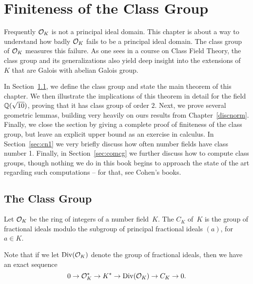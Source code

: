 \chapter{Finiteness of the Class Group}\label{ch:classgroup}
Frequently $\mathcal{O}_K$ is not a principal ideal domain.  This chapter is
about a way to understand how badly $\mathcal{O}_K$ fails to be a principal
ideal domain.  The class group of $\mathcal{O}_K$ measures this failure.  As
one sees in a course on Class Field Theory, the class group and its
generalizations also yield deep insight into the
extensions of~$K$ that are Galois with abelian Galois group.

In Section~\ref{sec:theclassgroup}, we define the class group and
state the main theorem of this chapter.  We then illustrate the
implications of this theorem in detail for the field $\mathbb{Q}(\sqrt{10})$,
proving that it has class group of order $2$. Next, we prove several
geometric lemmas, building very heavily on ours results from
Chapter~\ref{discnorm}.  Finally, we close the section by giving a
complete proof of finiteness of the class group, but leave an explicit
upper bound as an exercise in calculus.  In Section~\ref{sec:cn1} we
very briefly discuss how often number fields have class number 1.
Finally, in Section~\ref{sec:comcg} we further discuss how to compute
class groups, though nothing we do in this book begins to approach the
state of the art regarding such computations -- for that, see Cohen's
books.

\section{The Class Group}\label{sec:theclassgroup}

\begin{definition}
	Let $\mathcal{O}_K$ be the ring of integers of a number field~$K$.  The
	 $C_K$ of~$K$ is the group of fractional ideals
	modulo the subgroup of principal fractional ideals $(a)$, for $a\in K$.
\end{definition}

Note that if we let $\operatorname{Div}(\mathcal{O}_K)$ denote the group of  fractional
ideals, then we have an exact sequence
$$
	0 \to \mathcal{O}_K^* \to K^* \to \operatorname{Div}(\mathcal{O}_K) \to C_K \to 0.
$$

